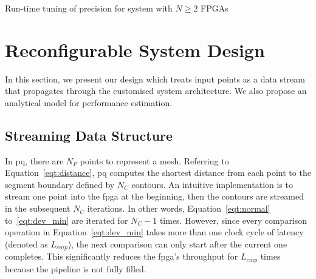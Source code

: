 \begin{algorithm}[ht]
\caption{Run-time tuning of precision for system with $N \geq 2$ FPGAs}
\begin{algorithmic}[1]
\REPEAT
\end{algorithmic}
\label{algo:reconfig}
\end{algorithm}



\section{Reconfigurable System Design}
\label{sec:precision_implementation}

In this section, we present our design which treats input points as a data stream that propagates through the customised system architecture.
We also propose an analytical model for performance estimation.

\subsection{Streaming Data Structure}
In \gls{pq}, there are $N_P$ points to represent a mesh.
Referring to Equation~\ref{eqt:distance}, \gls{pq} computes the shortest distance from each point to the segment boundary defined by $N_C$ contours.
An intuitive implementation is to stream one point into the \gls{fpga} at the beginning,
then the contours are streamed in the subsequent $N_C$ iterations.
In other words, Equation~\ref{eqt:normal} to~\ref{eqt:dev_min} are iterated for $N_C-1$ times.
However, since every comparison operation in Equation~\ref{eqt:dev_min} takes more than one clock cycle of latency (denoted as $L_{cmp}$), the next comparison can only start after the current one completes. 
This significantly reduces the \gls{fpga}'s throughput for $L_{cmp}$ times because the pipeline is not fully filled.

